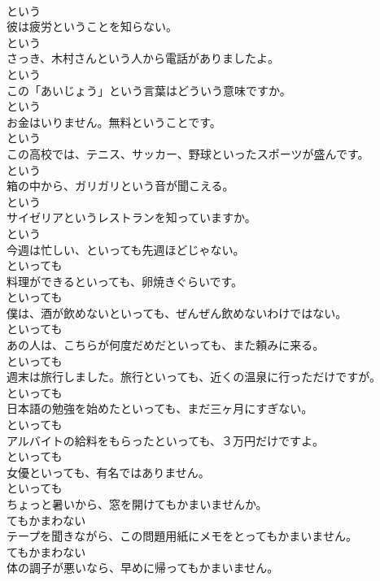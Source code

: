 \documentclass[8pt]{extreport}
\begin{document}
\begin{CJK}{UTF8}{min}
\\	という
\\	彼は疲労ということを知らない。	
\\	という
\\	さっき、木村さんという人から電話がありましたよ。	
\\	という
\\	この「あいじょう」という言葉はどういう意味ですか。	
\\	という
\\	お金はいりません。無料ということです。	
\\	という
\\	この高校では、テニス、サッカー、野球といったスポーツが盛んです。	
\\	という
\\	箱の中から、ガリガリという音が聞こえる。	
\\	という
\\	サイゼリアというレストランを知っていますか。	
\\	という
\\	今週は忙しい、といっても先週ほどじゃない。	
\\	といっても
\\	料理ができるといっても、卵焼きぐらいです。	
\\	といっても
\\	僕は、酒が飲めないといっても、ぜんぜん飲めないわけではない。	
\\	といっても
\\	あの人は、こちらが何度だめだといっても、また頼みに来る。	
\\	といっても
\\	週末は旅行しました。旅行といっても、近くの温泉に行っただけですが。	
\\	といっても
\\	日本語の勉強を始めたといっても、まだ三ヶ月にすぎない。	
\\	といっても
\\	アルバイトの給料をもらったといっても、３万円だけですよ。	
\\	といっても
\\	女優といっても、有名ではありません。	
\\	といっても
\\	ちょっと暑いから、窓を開けてもかまいませんか。	
\\	てもかまわない
\\	テープを聞きながら、この問題用紙にメモをとってもかまいません。	
\\	てもかまわない
\\	体の調子が悪いなら、早めに帰ってもかまいません。	

\end{CJK}
\end{document}
